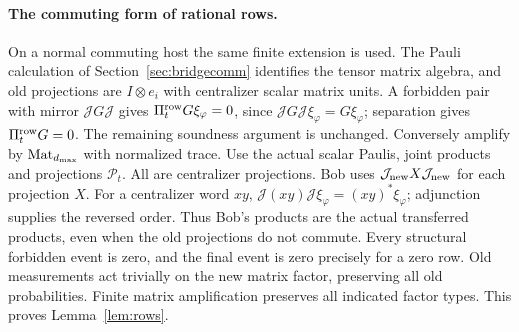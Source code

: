 \paragraph{The commuting form of rational rows.}
On a normal commuting host the same finite extension is used. The Pauli calculation of Section~\ref{sec:bridgecomm} identifies the tensor matrix algebra, and old projections are $I\otimes e_i$ with centralizer scalar matrix units. A forbidden pair with mirror $\mathcal JG\mathcal J$ gives $\Pi^{\rm row}_tG\xi_\varphi=0$, since $\mathcal JG\mathcal J\xi_\varphi=G\xi_\varphi$; separation gives $\Pi^{\rm row}_tG=0$. The remaining soundness argument is unchanged. Conversely amplify by $\mathrm{Mat}_{d_{\max}}$ with normalized trace. Use the actual scalar Paulis, joint products and projections $\mathcal P_t$. All are centralizer projections. Bob uses $\mathcal J_{\rm new}X\mathcal J_{\rm new}$ for each projection $X$. For a centralizer word $xy$, $\mathcal J(xy)\mathcal J\xi_\varphi=(xy)^*\xi_\varphi$; adjunction supplies the reversed order. Thus Bob's products are the actual transferred products, even when the old projections do not commute. Every structural forbidden event is zero, and the final event is zero precisely for a zero row. Old measurements act trivially on the new matrix factor, preserving all old probabilities. Finite matrix amplification preserves all indicated factor types. This proves Lemma~\ref{lem:rows}.

